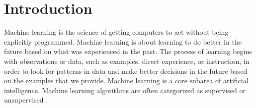 \documentclass[12pt]{article}
\numberwithin{equation}{section}
\numberwithin{table}{section}
\numberwithin{figure}{section}
\begin{document}

\section{Introduction}

Machine learning is the science of getting computers to act without being explicitly programmed\cite{5392560}. Machine learning is about learning to do better in the future based on what was experienced in the past. The process of learning begins with observations or data, such as examples, direct experience, or instruction, in order to look for patterns in data and make better decisions in the future based on the examples that we provide. Machine learning is a core subarea of artificial intelligence. Machine learning algorithms are often categorized as supervised or unsupervised \cite{Ratsch2004}.
\end{document}
